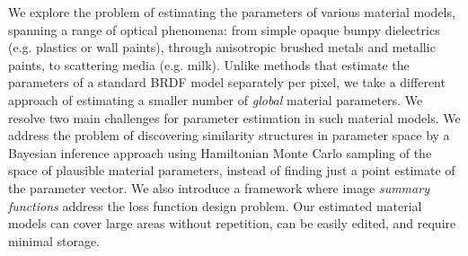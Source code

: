 We explore the problem of estimating the parameters of various material models, spanning a range of optical phenomena: from simple opaque bumpy dielectrics (e.g. plastics or wall paints), through anisotropic brushed metals and metallic paints, to scattering media (e.g. milk). Unlike methods that estimate the parameters of a standard BRDF model separately per pixel, we take a different approach of estimating a smaller number of \emph{global} material parameters. We resolve two main challenges for parameter estimation in such material models. We address the problem of discovering similarity structures in parameter space by a Bayesian inference approach using Hamiltonian Monte Carlo sampling of the space of plausible material parameters, instead of finding just a point estimate of the parameter vector. We also introduce a framework where image \emph{summary functions} address the loss function design problem. Our estimated material models can cover large areas without repetition, can be easily edited, and require minimal storage.
